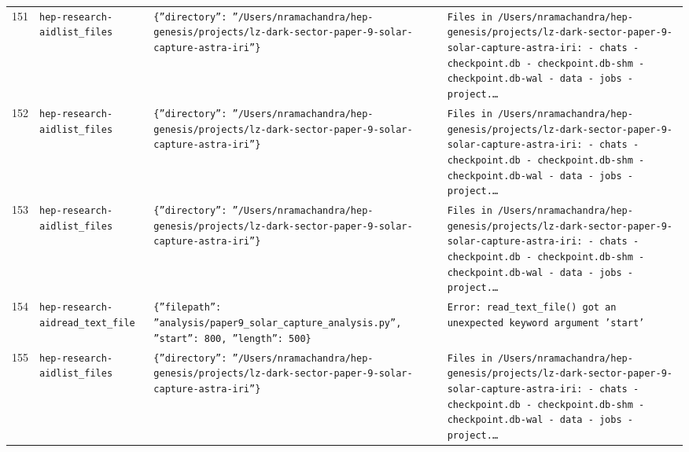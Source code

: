 \documentclass[11pt,a4paper]{article}
\begin{document}
\begin{longtable}{@{}p{}p{}p{}p{}@{}}
151 & \texttt{hep-research-aid}\newline\texttt{list\_\allowbreak{}files} & \texttt{\{''directory'':\allowbreak{} ''/\allowbreak{}Users/\allowbreak{}nramachandra/\allowbreak{}hep-genesis/\allowbreak{}projects/\allowbreak{}lz-dark-sector-paper-9-solar-capture-astra-iri''\}\allowbreak{}} & \texttt{Files in /\allowbreak{}Users/\allowbreak{}nramachandra/\allowbreak{}hep-genesis/\allowbreak{}projects/\allowbreak{}lz-dark-sector-paper-9-solar-capture-astra-iri:\allowbreak{}   - chats   - checkpoint.db   - checkpoint.db-shm   - checkpoint.db-wal   - data   - jobs   - project.\ldots{}\allowbreak{}} \\
152 & \texttt{hep-research-aid}\newline\texttt{list\_\allowbreak{}files} & \texttt{\{''directory'':\allowbreak{} ''/\allowbreak{}Users/\allowbreak{}nramachandra/\allowbreak{}hep-genesis/\allowbreak{}projects/\allowbreak{}lz-dark-sector-paper-9-solar-capture-astra-iri''\}\allowbreak{}} & \texttt{Files in /\allowbreak{}Users/\allowbreak{}nramachandra/\allowbreak{}hep-genesis/\allowbreak{}projects/\allowbreak{}lz-dark-sector-paper-9-solar-capture-astra-iri:\allowbreak{}   - chats   - checkpoint.db   - checkpoint.db-shm   - checkpoint.db-wal   - data   - jobs   - project.\ldots{}\allowbreak{}} \\
153 & \texttt{hep-research-aid}\newline\texttt{list\_\allowbreak{}files} & \texttt{\{''directory'':\allowbreak{} ''/\allowbreak{}Users/\allowbreak{}nramachandra/\allowbreak{}hep-genesis/\allowbreak{}projects/\allowbreak{}lz-dark-sector-paper-9-solar-capture-astra-iri''\}\allowbreak{}} & \texttt{Files in /\allowbreak{}Users/\allowbreak{}nramachandra/\allowbreak{}hep-genesis/\allowbreak{}projects/\allowbreak{}lz-dark-sector-paper-9-solar-capture-astra-iri:\allowbreak{}   - chats   - checkpoint.db   - checkpoint.db-shm   - checkpoint.db-wal   - data   - jobs   - project.\ldots{}\allowbreak{}} \\
154 & \texttt{hep-research-aid}\newline\texttt{read\_\allowbreak{}text\_\allowbreak{}file} & \texttt{\{''filepath'':\allowbreak{} ''analysis/\allowbreak{}paper9\_\allowbreak{}solar\_\allowbreak{}capture\_\allowbreak{}analysis.py'',\allowbreak{} ''start'':\allowbreak{} 800,\allowbreak{} ''length'':\allowbreak{} 500\}\allowbreak{}} & \texttt{Error:\allowbreak{} read\_\allowbreak{}text\_\allowbreak{}file()\allowbreak{} got an unexpected keyword argument 'start'} \\
155 & \texttt{hep-research-aid}\newline\texttt{list\_\allowbreak{}files} & \texttt{\{''directory'':\allowbreak{} ''/\allowbreak{}Users/\allowbreak{}nramachandra/\allowbreak{}hep-genesis/\allowbreak{}projects/\allowbreak{}lz-dark-sector-paper-9-solar-capture-astra-iri''\}\allowbreak{}} & \texttt{Files in /\allowbreak{}Users/\allowbreak{}nramachandra/\allowbreak{}hep-genesis/\allowbreak{}projects/\allowbreak{}lz-dark-sector-paper-9-solar-capture-astra-iri:\allowbreak{}   - chats   - checkpoint.db   - checkpoint.db-shm   - checkpoint.db-wal   - data   - jobs   - project.\ldots{}\allowbreak{}} \\

\end{longtable}
\end{document}
